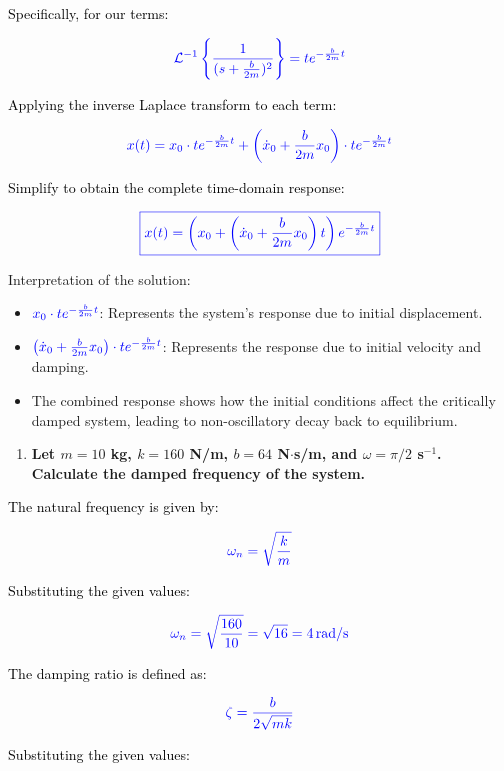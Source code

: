 \documentclass[12pt]{article}
\begin{document}
\noindent
\textcolor{black}{Specifically, for our terms:}

\[
	\textcolor{blue}{\mathcal{L}^{-1}\left\{\frac{1}{(s + \frac{b}{2m})^2}\right\} = t e^{-\frac{b}{2m}t}}
\]

\noindent
\textcolor{black}{Applying the inverse Laplace transform to each term:}

\[
	\textcolor{blue}{x(t) = x_0 \cdot t e^{-\frac{b}{2m}t} + \left(\dot{x}_0 + \frac{b}{2m}x_0\right) \cdot t e^{-\frac{b}{2m}t}}
\]

\noindent
\textcolor{black}{Simplify to obtain the complete time-domain response:}

\[
	\textcolor{blue}{\boxed{x(t) = \left(x_0 + \left(\dot{x}_0 + \frac{b}{2m}x_0\right)t\right) e^{-\frac{b}{2m}t}}}
\]
	      
\noindent Interpretation of the solution:
	      
\begin{itemize}
	\item \(\textcolor{blue}{x_0 \cdot t e^{-\frac{b}{2m}t}}\): Represents the system's response due to initial displacement.
	\item \(\textcolor{blue}{\left(\dot{x}_0 + \frac{b}{2m}x_0\right) \cdot t e^{-\frac{b}{2m}t}}\): Represents the response due to initial velocity and damping.
	\item The combined response shows how the initial conditions affect the critically damped system, leading to non-oscillatory decay back to equilibrium.
\end{itemize}
\begin{enumerate}  
	\item[(d)] \textbf{Let $m = 10$ kg, $k = 160$ N/m, $b = 64$ N$\cdot$s/m, and $\omega = \pi/2$ s$^{-1}$. Calculate the damped frequency of the system.}
\end{enumerate}
\noindent
\textcolor{black}{The natural frequency is given by:}

\[
	\textcolor{blue}{\omega_n = \sqrt{\frac{k}{m}}}
\]

\noindent
\textcolor{black}{Substituting the given values:}

\[
	\textcolor{blue}{\omega_n = \sqrt{\frac{160}{10}} = \sqrt{16} = 4 \, \text{rad/s}}
\]

\noindent
\textcolor{black}{The damping ratio is defined as:}

\[
	\textcolor{blue}{\zeta = \frac{b}{2\sqrt{mk}}}
\]

\noindent
\textcolor{black}{Substituting the given values:}
\end{document}

